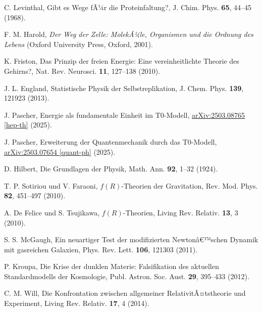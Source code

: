 ﻿\documentclass[twocolumn,aps,prl]{revtex4-2}
\begin{document}
{{{{{{{{{{{{{{{{\begin{thebibliography}{99}
																				 C. Levinthal, Gibt es Wege fÃ¼r die Proteinfaltung?, J. Chim. Phys. \textbf{65}, 44--45 (1968).
																				
																				 F. M. Harold, \textit{Der Weg der Zelle: MolekÃ¼le, Organismen und die Ordnung des Lebens} (Oxford University Press, Oxford, 2001).
																				
																				 K. Friston, Das Prinzip der freien Energie: Eine vereinheitlichte Theorie des Gehirns?, Nat. Rev. Neurosci. \textbf{11}, 127--138 (2010).
																				
																				 J. L. England, Statistische Physik der Selbstreplikation, J. Chem. Phys. \textbf{139}, 121923 (2013).
																				
																				 J. Pascher, Energie als fundamentale Einheit im T0-Modell, \href{https://github.com/jpascher/T0-Time-Mass-Duality/tree/main/2/pdf/Deutsch/EnergieEinheitT0.pdf}{arXiv:2503.08765 [hep-th]} (2025).
																				
																				 J. Pascher, Erweiterung der Quantenmechanik durch das T0-Modell, \href{https://github.com/jpascher/T0-Time-Mass-Duality/tree/main/2/pdf/Deutsch/QuantenT0.pdf}{arXiv:2503.07654 [quant-ph]} (2025).
																				
																				 D. Hilbert, Die Grundlagen der Physik, Math. Ann. \textbf{92}, 1--32 (1924).
																				
																				 T. P. Sotiriou und V. Faraoni, \(f(R)\)-Theorien der Gravitation, Rev. Mod. Phys. \textbf{82}, 451--497 (2010).
																				
																				 A. De Felice und S. Tsujikawa, \(f(R)\)-Theorien, Living Rev. Relativ. \textbf{13}, 3 (2010).
																				
																				 S. S. McGaugh, Ein neuartiger Test der modifizierten Newtonâ€™schen Dynamik mit gasreichen Galaxien, Phys. Rev. Lett. \textbf{106}, 121303 (2011).
																				
																				 P. Kroupa, Die Krise der dunklen Materie: Falsifikation des aktuellen Standardmodells der Kosmologie, Publ. Astron. Soc. Aust. \textbf{29}, 395--433 (2012).
																				
																				 C. M. Will, Die Konfrontation zwischen allgemeiner RelativitÃ¤tstheorie und Experiment, Living Rev. Relativ. \textbf{17}, 4 (2014).
																				

\end{thebibliography}}}}}}}}}}}}}}}}}
\end{document}
